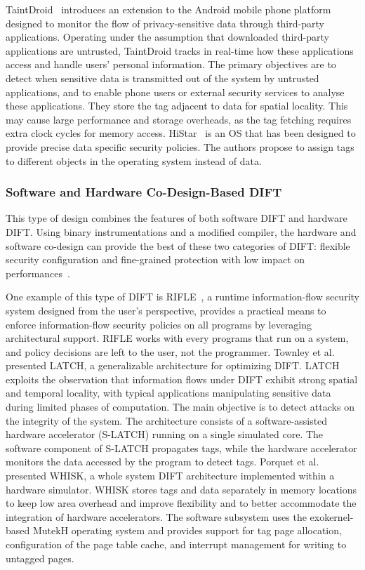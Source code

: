 TaintDroid~\cite{EGHTCCJMS-14-tocs} introduces an extension to the Android mobile phone platform designed to monitor the flow of privacy-sensitive data through third-party applications. Operating under the assumption that downloaded third-party applications are untrusted, TaintDroid tracks in real-time how these applications access and handle users’ personal information. The primary objectives are to detect when sensitive data is transmitted out of the system by untrusted applications, and to enable phone users or external security services to analyse these applications. They store the tag adjacent to data for spatial locality. This may cause large performance and storage overheads, as the tag fetching requires extra clock cycles for memory access.
HiStar~\cite{ZBKM-11-commacm} is an OS that has been designed to provide precise data specific security policies. The authors propose to assign tags to different objects in the operating system instead of data.


\subsubsection{Software and Hardware Co-Design-Based DIFT}
This type of design combines the features of both software DIFT and hardware DIFT. Using binary instrumentations and a modified compiler, the hardware and software co-design can provide the best of these two categories of DIFT: flexible security configuration and fine-grained protection with low impact on performances~\cite{CGDJ-21-micromac, BSMCVEJCO-21-acmcsur}.

One example of this type of DIFT is RIFLE~\cite{VBCROBRVA-04-micro}, a runtime information-flow security system designed from the user's perspective, provides a practical means to enforce information-flow security policies on all programs by leveraging architectural support. RIFLE works with every programs that run on a system, and policy decisions are left to the user, not the programmer.
Townley et al.~\cite{TKPAY-19-micro} presented LATCH, a generalizable architecture for optimizing DIFT. 
LATCH exploits the observation that information flows under DIFT exhibit strong spatial and temporal locality, with typical applications manipulating sensitive data during limited phases of computation. The main objective is to detect attacks on the integrity of the system. The architecture consists of a software-assisted hardware accelerator (S-LATCH) running on a single simulated core. The software component of S-LATCH propagates tags, while the hardware accelerator monitors the data accessed by the program to detect tags. 
Porquet et al.~\cite{PS-13-codes} presented WHISK, a whole system DIFT architecture implemented within a hardware simulator. WHISK stores tags and data separately in memory locations to keep low area overhead and improve flexibility and to better accommodate the integration of hardware accelerators. The software subsystem uses the exokernel-based MutekH operating system and provides support for tag page allocation, configuration of the page table cache, and interrupt management for writing to untagged pages.

